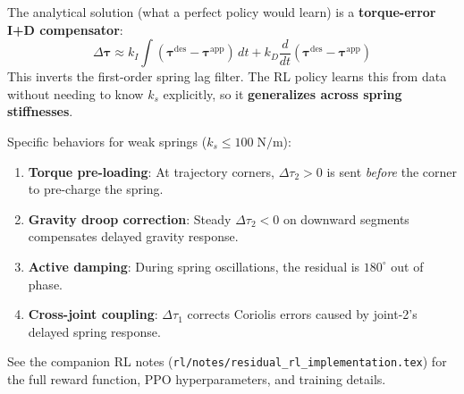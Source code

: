 \documentclass[11pt,a4paper]{article}
\newcommand{\btau}{\bm{\tau}}
\begin{document}
\begin{resultbox}
The analytical solution (what a perfect policy would learn) is a
\textbf{torque-error I+D compensator}:
\[
  \Delta\btau \approx k_I \int (\btau^{\text{des}} - \btau^{\text{app}})\,dt
  + k_D \frac{d}{dt}(\btau^{\text{des}} - \btau^{\text{app}})
\]
This inverts the first-order spring lag filter.  The RL policy learns this
from data without needing to know $k_s$ explicitly, so it \textbf{generalizes
across spring stiffnesses}.
\end{resultbox}

Specific behaviors for weak springs ($k_s \leq 100\;\text{N/m}$):
\begin{enumerate}[leftmargin=2em]
    \item \textbf{Torque pre-loading}: At trajectory corners, $\Delta\tau_2 > 0$ is sent \emph{before} the corner to pre-charge the spring.
    \item \textbf{Gravity droop correction}: Steady $\Delta\tau_2 < 0$ on downward segments compensates delayed gravity response.
    \item \textbf{Active damping}: During spring oscillations, the residual is $180^\circ$ out of phase.
    \item \textbf{Cross-joint coupling}: $\Delta\tau_1$ corrects Coriolis errors caused by joint-2's delayed spring response.
\end{enumerate}

See the companion RL notes (\texttt{rl/notes/residual\_rl\_implementation.tex})
for the full reward function, PPO hyperparameters, and training details.
\end{document}
